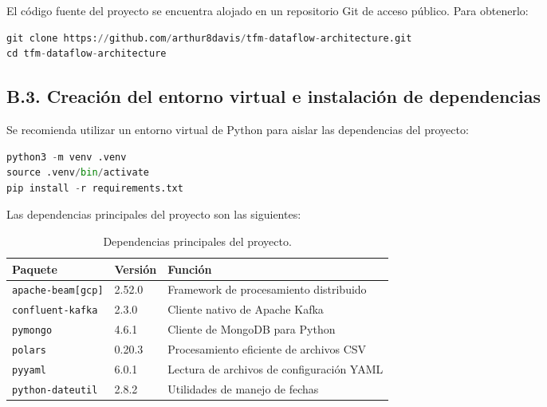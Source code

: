 \documentclass[12pt,a4paper]{article}
\begin{document}
El código fuente del proyecto se encuentra alojado en un repositorio Git de acceso público. Para obtenerlo:

\begin{lstlisting}[language=Python, caption=git-clone]
git clone https://github.com/arthur8davis/tfm-dataflow-architecture.git
cd tfm-dataflow-architecture
\end{lstlisting}

\subsection*{B.3. Creación del entorno virtual e instalación de dependencias}

Se recomienda utilizar un entorno virtual de Python para aislar las dependencias del proyecto:

\begin{lstlisting}[language=Python, caption=virtualenv]
python3 -m venv .venv
source .venv/bin/activate
pip install -r requirements.txt
\end{lstlisting}

Las dependencias principales del proyecto son las siguientes:

\begin{table}[h!]
    \centering
    \begin{tabular}{|l|l|l|}
        \hline
        \textbf{Paquete}          & \textbf{Versión} & \textbf{Función}                          \\ \hline
        \texttt{apache-beam[gcp]} & 2.52.0           & Framework de procesamiento distribuido    \\ \hline
        \texttt{confluent-kafka}  & 2.3.0            & Cliente nativo de Apache Kafka            \\ \hline
        \texttt{pymongo}          & 4.6.1            & Cliente de MongoDB para Python            \\ \hline
        \texttt{polars}           & 0.20.3           & Procesamiento eficiente de archivos CSV   \\ \hline
        \texttt{pyyaml}           & 6.0.1            & Lectura de archivos de configuración YAML \\ \hline
        \texttt{python-dateutil}  & 2.8.2            & Utilidades de manejo de fechas            \\ \hline
    \end{tabular}
    \caption{Dependencias principales del proyecto.}
\end{table}
\end{document}
